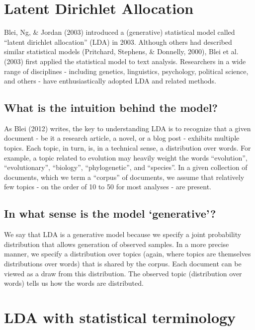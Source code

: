 \documentclass[12pt,]{article}
\begin{document}
\section{Latent Dirichlet Allocation}\label{latent-dirichlet-allocation}

Blei, Ng, \& Jordan (2003) introduced a (generative) statistical model
called ``latent dirichlet allocation'' (LDA) in 2003. Although others
had described similar statistical models (Pritchard, Stephens, \&
Donnelly, 2000), Blei et al. (2003) first applied the statistical model
to text analysis. Researchers in a wide range of disciplines - including
genetics, linguistics, psychology, political science, and others - have
enthusiastically adopted LDA and related methods.

\subsection{What is the intuition behind the
model?}\label{what-is-the-intuition-behind-the-model}

As Blei (2012) writes, the key to understanding LDA is to recognize that
a given document - be it a research article, a novel, or a blog post -
exhibits multiple topics. Each topic, in turn, is, in a technical sense,
a distribution over words. For example, a topic related to evolution may
heavily weight the words ``evolution'', ``evolutionary'', ``biology'',
``phylogenetic'', and ``species''. In a given collection of documents,
which we term a ``corpus'' of documents, we assume that relatively few
topics - on the order of 10 to 50 for most analyses - are present.

\subsection{\texorpdfstring{In what sense is the model
`generative'?}{In what sense is the model generative?}}\label{in-what-sense-is-the-model-generative}

We say that LDA is a generative model because we specify a joint
probability distribution that allows generation of observed samples. In
a more precise manner, we specify a distribution over topics (again,
where topics are themselves distributions over words) that is shared by
the corpus. Each document can be viewed as a draw from this
distribution. The observed topic (distribution over words) tells us how
the words are distributed.

\section{LDA with statistical
terminology}\label{lda-with-statistical-terminology}
\end{document}
